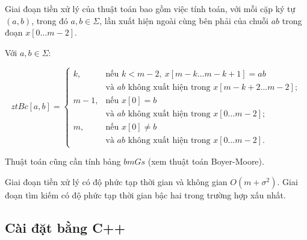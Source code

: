 Giai đoạn tiền xử lý của thuật toán bao gồm việc tính toán, với mỗi cặp ký tự $(a, b)$, trong đó $a, b \in \Sigma$, lần xuất hiện ngoài cùng bên phải của chuỗi $ab$ trong đoạn $x[0 \dots m - 2]$.

Với $a,b \in \Sigma$:

\[
ztBc[a,b] =
\begin{cases}
k, & \text{nếu } k < m-2,\ x[m-k \dots m-k+1] = ab \\
   & \text{và } ab \text{ không xuất hiện trong } x[m-k+2 \dots m-2]; \\

m-1, & \text{nếu } x[0] = b \\
     & \text{và } ab \text{ không xuất hiện trong } x[0 \dots m-2]; \\

m, & \text{nếu } x[0] \neq b \\
   & \text{và } ab \text{ không xuất hiện trong } x[0 \dots m-2].
\end{cases}
\]

Thuật toán cũng cần tính bảng $bmGs$ (xem thuật toán Boyer-Moore).

Giai đoạn tiền xử lý có độ phức tạp thời gian và không gian $O(m + \sigma ^ 2)$. Giai đoạn tìm kiếm có độ phức tạp thời gian bậc hai trong trường hợp xấu nhất.

\subsection{Cài đặt bằng C++}

